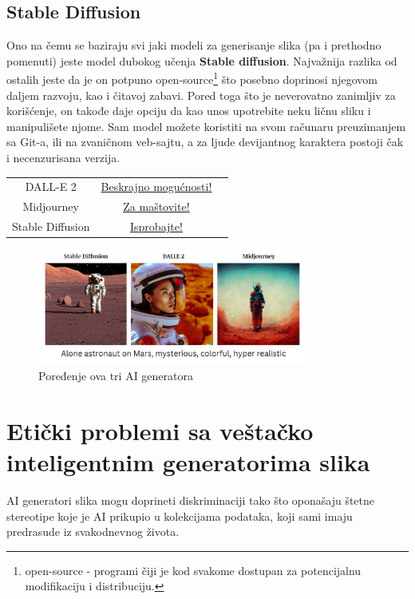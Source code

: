 \documentclass[12pt, letterpaper]{article}
\begin{document}
\subsection{Stable Diffusion}
Ono na čemu se baziraju svi jaki modeli za generisanje slika (pa i prethodno pomenuti) jeste model dubokog učenja \textbf{Stable diffusion}. Najvažnija razlika od ostalih jeste da je on potpuno open-source\footnote{open-source - programi čiji je kod svakome dostupan za potencijalnu modifikaciju i distribuciju.} što posebno doprinosi njegovom daljem razvoju, kao i čitavoj zabavi. Pored toga što je neverovatno zanimljiv za korišćenje, on takođe daje opciju da kao unos upotrebite neku ličnu sliku i manipulišete njome. Sam model možete koristiti na svom računaru preuzimanjem sa Git-a, ili na zvaničnom veb-sajtu, a za ljude devijantnog karaktera postoji čak i necenzurisana verzija.
\begin{center}
\begin{tabular}{ |c|c|c| } 
 \hline
 DALL-E 2 & \href{https://openai.com/dall-e-2/}{Beskrajno mogućnosti!} \\
 Midjourney & \href{https://www.midjourney.com/}{Za maštovite!} \\
 Stable Diffusion & \href{https://beta.dreamstudio.ai/dream}{Isprobajte!} \\
 \hline
\end{tabular}
\end{center}

\begin{figure}[htp]
\centering
\includegraphics[width=0.8\textwidth]{astronaut.png}
\caption{Poređenje ova tri AI generatora}
\label{fig: Astronaut}
\end{figure}
 
\pagebreak

\section{Etički problemi sa veštačko inteligentnim generatorima slika}

AI generatori slika mogu doprineti diskriminaciji tako što oponašaju štetne stereotipe koje je AI prikupio u kolekcijama podataka, koji sami imaju predrasude iz svakodnevnog života.
\end{document}
